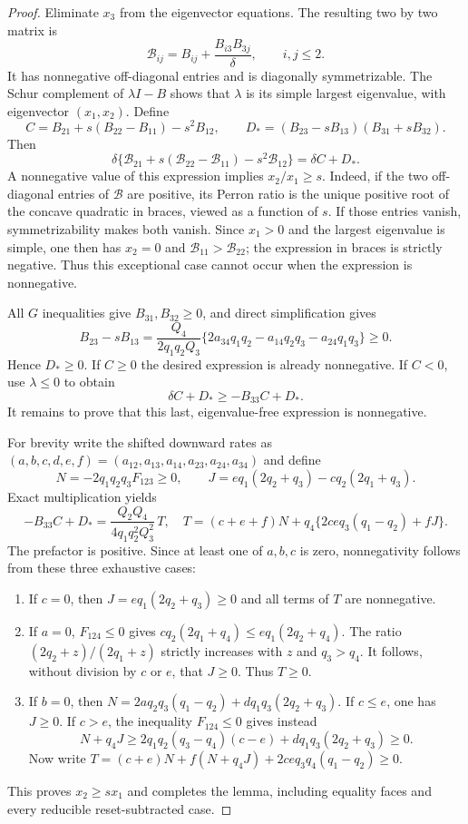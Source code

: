 \documentclass[11pt]{article}
\begin{document}
\begin{proof}
Eliminate $x_3$ from the eigenvector equations. The resulting two by two
matrix is
\[
\mathcal B_{ij}=B_{ij}+\frac{B_{i3}B_{3j}}{\delta},\qquad i,j\leq2.
\]
It has nonnegative off-diagonal entries and is diagonally symmetrizable.
The Schur complement of $\lambda I-B$ shows that $\lambda$ is its simple
largest eigenvalue, with eigenvector $(x_1,x_2)$.
Define
\[
C=B_{21}+s(B_{22}-B_{11})-s^2B_{12},\qquad
D_*=(B_{23}-sB_{13})(B_{31}+sB_{32}).
\]
Then
\[
\delta\{\mathcal B_{21}+s(\mathcal B_{22}-\mathcal B_{11})
-s^2\mathcal B_{12}\}=\delta C+D_*.
\]
A nonnegative value of this expression implies $x_2/x_1\geq s$. Indeed,
if the two off-diagonal entries of $\mathcal B$ are positive, its Perron
ratio is the unique positive root of the concave quadratic in braces,
viewed as a function of $s$. If those entries vanish, symmetrizability makes
both vanish. Since $x_1>0$ and the largest eigenvalue is simple, one then
has $x_2=0$ and $\mathcal B_{11}>\mathcal B_{22}$; the expression in braces
is strictly negative. Thus this exceptional case cannot occur when the
expression is nonnegative.

All $G$ inequalities give $B_{31},B_{32}\geq0$, and direct simplification gives
\[
B_{23}-sB_{13}
=\frac{Q_4}{2q_1q_2Q_3}
\{2a_{34}q_1q_2-a_{14}q_2q_3-a_{24}q_1q_3\}\geq0.
\]
Hence $D_*\geq0$. If $C\geq0$ the desired expression is already
nonnegative. If $C<0$, use $\lambda\leq0$ to obtain
\[
\delta C+D_*\geq-B_{33}C+D_*.
\]
It remains to prove that this last, eigenvalue-free expression is nonnegative.

For brevity write the shifted downward rates as
$(a,b,c,d,e,f)=(a_{12},a_{13},a_{14},a_{23},a_{24},a_{34})$ and define
\[
N=-2q_1q_2q_3F_{123}\geq0,\qquad
J=e q_1(2q_2+q_3)-c q_2(2q_1+q_3).
\]
Exact multiplication yields
\[
-B_{33}C+D_*=
\frac{Q_2Q_4}{4q_1q_2^2Q_3^2}\,T,
\quad
T=(c+e+f)N+q_4\{2ceq_3(q_1-q_2)+fJ\}.
\]
The prefactor is positive. Since at least one of $a,b,c$ is zero,
nonnegativity follows from these three exhaustive cases:
\begin{enumerate}
\item If $c=0$, then $J=e q_1(2q_2+q_3)\geq0$ and all terms of $T$
are nonnegative.
\item If $a=0$, $F_{124}\leq0$ gives
$c q_2(2q_1+q_4)\leq e q_1(2q_2+q_4)$.
The ratio $(2q_2+z)/(2q_1+z)$ strictly increases with $z$ and
$q_3>q_4$. It follows, without division by $c$ or $e$, that $J\geq0$.
Thus $T\geq0$.
\item If $b=0$, then
$N=2a q_2q_3(q_1-q_2)+d q_1q_3(2q_2+q_3)$.
If $c\leq e$, one has $J\geq0$. If $c>e$, the inequality
$F_{124}\leq0$ gives instead
\[
N+q_4J\geq
2q_1q_2(q_3-q_4)(c-e)+d q_1q_3(2q_2+q_3)\geq0.
\]
Now write
$T=(c+e)N+f(N+q_4J)+2ceq_3q_4(q_1-q_2)\geq0$.
\end{enumerate}
This proves $x_2\geq sx_1$ and completes the lemma, including equality
faces and every reducible reset-subtracted case.
\end{proof}
\end{document}
